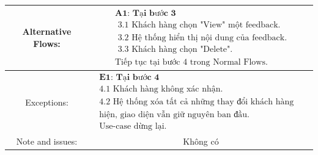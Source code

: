 \begin{tabular}{|c|c|c|c|}
\hline  Alternative Flows: & \multicolumn{3}{|c|}{$\begin{array}{l}
\textbf{A1: Tại bước 3}\\
\text { 3.1 Khách hàng chọn "View" một feedback.} \\
\text { 3.2 Hệ thống hiển thị nội dung của feedback.} \\
\text { 3.3 Khách hàng chọn "Delete".  }\\
\text {Tiếp tục tại bước 4 trong Normal Flows.} 
\end{array}$} \\
\hline Exceptions: & \multicolumn{3}{|c|}{$\begin{array}{l}
\textbf { E1: Tại bước 4 } \\
\text { 4.1 Khách hàng không xác nhận.} \\
\text { 4.2 Hệ thống xóa tất cả những thay đổi khách hàng vừa thực } \\
\text { hiện, giao diện vẫn giữ nguyên ban đầu.} \\
\text { Use-case dừng lại.} 
\text {}\end{array}$} \\
\hline Note and issues: & \multicolumn{3}{|c|}{ Không có } \\
\hline
\end{tabular}


